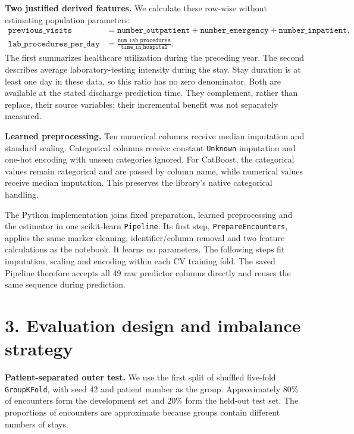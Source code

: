 \documentclass[11pt,a4paper]{article}
\newcommand{\pageheading}[2]{\section*{\color{ink}#1. #2}}
\newcommand{\nextpage}{\clearpage}
\begin{document}
\textbf{Two justified derived features.} We calculate these row-wise without estimating population parameters:
\begin{align*}
\texttt{previous\_visits} &= \texttt{number\_outpatient}+\texttt{number\_emergency}+\texttt{number\_inpatient},\\
\texttt{lab\_procedures\_per\_day} &= \frac{\texttt{num\_lab\_procedures}}{\texttt{time\_in\_hospital}}.
\end{align*}
The first summarizes healthcare utilization during the preceding year. The second describes average laboratory-testing intensity during the stay. Stay duration is at least one day in these data, so this ratio has no zero denominator. Both are available at the stated discharge prediction time. They complement, rather than replace, their source variables; their incremental benefit was not separately measured.

\textbf{Learned preprocessing.} Ten numerical columns receive median imputation and standard scaling. Categorical columns receive constant \texttt{Unknown} imputation and one-hot encoding with unseen categories ignored. For CatBoost, the categorical values remain categorical and are passed by column name, while numerical values receive median imputation. This preserves the library's native categorical handling.

The Python implementation joins fixed preparation, learned preprocessing and the estimator in one scikit-learn \texttt{Pipeline}. Its first step, \texttt{PrepareEncounters}, applies the same marker cleaning, identifier/column removal and two feature calculations as the notebook. It learns no parameters. The following steps fit imputation, scaling and encoding within each CV training fold. The saved Pipeline therefore accepts all 49 raw predictor columns directly and reuses the same sequence during prediction.

\nextpage
\pageheading{3}{Evaluation design and imbalance strategy}
\textbf{Patient-separated outer test.} We use the first split of shuffled five-fold \texttt{GroupKFold}, with seed 42 and patient number as the group. Approximately 80\% of encounters form the development set and 20\% form the held-out test set. The proportions of encounters are approximate because groups contain different numbers of stays.
\end{document}
